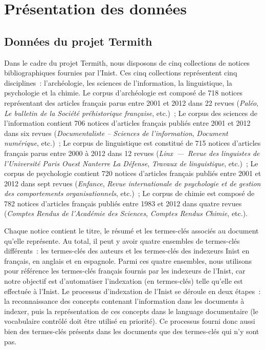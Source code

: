 \chapter{Présentation des données}
  \section{Données du projet Termith}
    Dans le cadre du projet Termith, nous disposons de cinq collections de
    notices bibliographiques fournies par l'Inist. Ces cinq collections
    représentent cinq disciplines~: l'archéologie, les sciences de
    l'information, la linguistique, la psychologie et la chimie. Le corpus
    d'archéologie est composé de 718 notices représentant des articles français
    parus entre 2001 et 2012 dans 22 revues (\textit{Paléo}, \textit{Le bulletin
    de la Société préhistorique française}, etc.)~; Le corpus des sciences de
    l'information contient 706 notices d'articles français publiés entre 2001 et
    2012 dans six revues (\textit{Documentaliste -- Sciences de l'information},
    \textit{Document numérique}, etc.)~; Le corpus de linguistique est constitué
    de 715 notices d'articles français parus entre 2000 à 2012 dans 12 revues
    (\textit{Linx~---~Revue des linguistes de l'Université Paris Ouest Nanterre
    La Défense}, \textit{Travaux de linguistique}, etc.)~; Le corpus de
    psychologie contient 720 notices d'articles français publiés entre 2001 et
    2012 dans sept revues (\textit{Enfance}, \textit{Revue internationale de
    psychologie et de gestion des comportements organisationnels}, etc.)~; Le
    corpus de chimie est composé de 782 notices d'articles français publiés
    entre 1983 et 2012 dans quatre revues (\textit{Comptes Rendus de l'Académie
    des Sciences}, \textit{Comptes Rendus Chimie}, etc.).
    
    Chaque notice contient le titre, le résumé et les termes-clés associés au
    document qu'elle représente. Au total, il peut y avoir quatre ensembles de
    termes-clés différents~: les termes-clés des auteurs et les termes-clés des
    indexeurs Inist en français, en anglais et en espagnole. Parmi ces quatre
    ensembles, nous utilisons pour référence les termes-clés français fournis
    par les indexeurs de l'Inist, car notre objectif est d'automatiser
    l'indexation (en termes-clés) telle qu'elle est effectuée à l'Inist. Le
    processus d'indexation de l'Inist se déroule en deux étapes~: la
    reconnaissance des concepts contenant l'information dans les documents à
    indexer, puis la représentation de ces concepts dans le language
    documentaire (le vocabulaire contrôlé doit être utilisé en priorité). Ce
    processus fourni donc aussi bien des termes-clés présents dans les documents
    que des termes-clés qui n'y sont pas.

